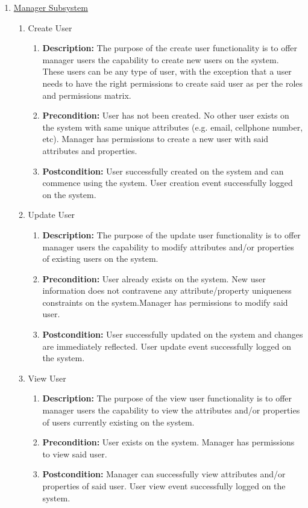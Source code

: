 \documentclass{article}
\begin{document}
\begin{enumerate}
	\item \underline{Manager Subsystem}
    \begin{enumerate}
		\item Create User
		\begin{enumerate}
			\item \textbf{Description:} The purpose of the create user functionality is to offer manager users the capability to create new users on the system. These users can be any type of user, with the exception that a user needs to have the right permissions to create said user as per the roles and permissions matrix.
			\item \textbf{Precondition:} User has not been created. No other user exists on the system with same unique attributes (e.g. email, cellphone number, etc). Manager has permissions to create a new user with said attributes and properties.

			\item \textbf{Postcondition:} User successfully created on the system and can commence using the system. User creation event successfully logged on the system.
\newline
		\end{enumerate}
		
		\item Update User
		\begin{enumerate}
			\item \textbf{Description:} The purpose of the update user functionality is to offer manager users the capability to modify attributes and/or properties of existing users on the system.
			\item \textbf{Precondition:} User already exists on the system. New user information does not contravene any attribute/property uniqueness constraints on the system.Manager has permissions to modify said user.

			\item \textbf{Postcondition:} User successfully updated on the system and changes are immediately reflected. User update event successfully logged on the system.
\newline
		\end{enumerate}
		
		\item View User
		\begin{enumerate}
			\item \textbf{Description:} The purpose of the view user functionality is to offer manager users the capability to view the attributes and/or properties of users currently existing on the system.
			\item \textbf{Precondition:} User exists on the system. Manager has permissions to view said user.
			\item \textbf{Postcondition:} Manager can successfully view attributes and/or properties of said user. User view event successfully logged on the system.
\newline
		\end{enumerate}
        

\end{enumerate}
\end{enumerate}
\end{document}
